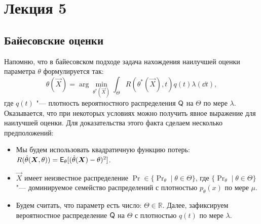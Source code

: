 
\section{Лекция 5}
\subsection{Байесовские оценки}
Напомню, что в байесовском подходе задача нахождения наилучшей оценки параметра $\theta$ формулируется так:
\[
    \hat{\theta}(\vec{X}) = \arg\min_{\theta^{*}(\vec{X})} \int_{\Theta} R(\theta^{*}(\vec{X}), t) q(t)\lambda(\dd t),
\]
где $q(t)$ "--- плотность вероятностного распределения $\mathsf{Q}$ на $\Theta$ по мере $\lambda$. Оказывается, что при некоторых условиях можно получить явное выражение для наилучшей оценки. Для доказательства этого факта сделаем несколько предположений:
\begin{itemize}
    \item Мы будем использовать квадратичную функцию потерь: $R(\hat{\theta}(\bm{X}, \theta)) = \operatorname{\mathsf{E}}_{\theta}[(\hat{\theta}(\bm{X}) - \theta)^{2}]$.
    \item $\vec{X}$ имеет неизвестное распределение $\Pr \in \{\Pr_{\theta} \mid \theta \in \Theta\}$, где $\{\Pr_{\theta} \mid \theta \in \Theta\}$ "--- доминируемое семейство распределений с плотностью $p_{\theta}(x)$ по мере $\mu$.
    \item Будем считать, что параметр есть число: $\Theta \in \mathbb{R}$. Далее, зафиксируем вероятностное распределение $\mathsf{Q}$ на $\Theta$ с плотностью $q(t)$ по мере $\lambda$.
\end{itemize}

